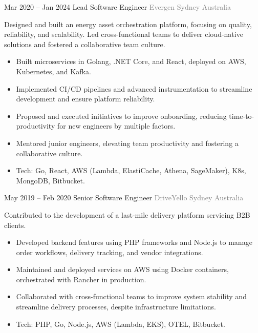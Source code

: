 \documentclass[14pt, a4paper, sans]{moderncv}
\begin{document}
    \cventry
    {Mar 2020 -- Jan 2024}
    {Lead Software Engineer}
    {\newline \textcolor{gray}{Evergen}}
    {\textcolor{gray}{Sydney}}
    {\textcolor{gray}{Australia}}
    {
        \fontsize{13}{16}\selectfont
        Designed and built an energy asset orchestration platform, focusing on quality, reliability, and scalability. Led cross-functional teams to deliver cloud-native solutions and fostered a collaborative team culture.
        \begin{itemize}
            \item Built microservices in Golang, .NET Core, and React, deployed on AWS, Kubernetes, and Kafka.
            \item Implemented CI/CD pipelines and advanced instrumentation to streamline development and ensure platform reliability.
            \item Proposed and executed initiatives to improve onboarding, reducing time-to-productivity for new engineers by multiple factors.
            \item Mentored junior engineers, elevating team productivity and fostering a collaborative culture.
            \item Tech: Go, React, AWS (Lambda, ElastiCache, Athena, SageMaker), K8s, MongoDB, Bitbucket.
        \end{itemize}
    }

    \cventry
    {May 2019 -- Feb 2020}
    {Senior Software Engineer}
    {\newline \textcolor{gray}{DriveYello}}
    {\textcolor{gray}{Sydney}}
    {\textcolor{gray}{Australia}}
    {
        \fontsize{13}{16}\selectfont
        Contributed to the development of a last-mile delivery platform servicing B2B clients.
        \begin{itemize}
            \item Developed backend features using PHP frameworks and Node.js to manage order workflows, delivery tracking, and vendor integrations.
            \item Maintained and deployed services on AWS using Docker containers, orchestrated with Rancher in production.
            \item Collaborated with cross-functional teams to improve system stability and streamline delivery processes, despite infrastructure limitations.
            \item Tech: PHP, Go, Node.js, AWS (Lambda, EKS), OTEL, Bitbucket.
        \end{itemize}
    }
\end{document}

